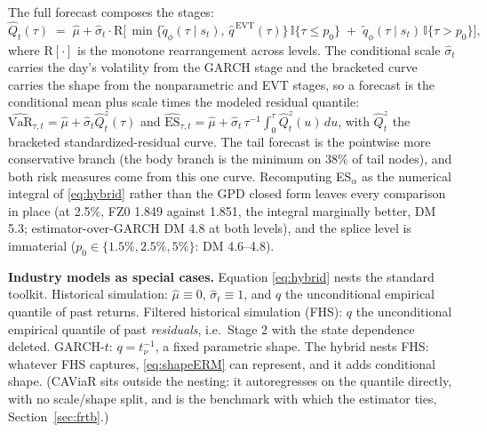 \documentclass[11pt]{article}
\newcommand{\VaR}{\mathrm{VaR}}
\newcommand{\ES}{\mathrm{ES}}
\theoremstyle{remark}
\begin{document}
The full forecast composes the stages:
\begin{equation}
\widehat{Q}_t(\tau) \;=\; \widehat{\mu} + \widehat{\sigma}_t \cdot
\mathrm{R}\Big[\, \min\{\widetilde{q}_\phi(\tau \mid s_t),\,
\widehat{q}^{\,\mathrm{EVT}}(\tau)\}\,\mathbb{I}\{\tau \le p_0\}
\;+\; \widetilde{q}_\phi(\tau \mid s_t)\,\mathbb{I}\{\tau > p_0\}
\Big],
\label{eq:hybrid}
\end{equation}
where $\mathrm{R}[\cdot]$ is the monotone rearrangement across
levels. The conditional scale $\widehat{\sigma}_t$ carries the day's
volatility from the GARCH stage and the bracketed curve carries the shape
from the nonparametric and EVT stages, so a forecast is the conditional mean
plus scale times the modeled residual quantile: $\widehat{\VaR}_{\tau,t}=\widehat{\mu}+\widehat{\sigma}_t\widehat{Q}^{z}_t(\tau)$
and $\widehat{\ES}_{\tau,t}=\widehat{\mu}+\widehat{\sigma}_t\,\tau^{-1}\!\int_0^\tau \widehat{Q}^{z}_t(u)\,du$,
with $\widehat{Q}^{z}_t$ the bracketed standardized-residual curve.
The tail forecast is the pointwise more conservative branch (the body branch is the minimum on 38\% of tail
nodes), and both risk measures come from this one curve. Recomputing
ES$_\alpha$ as the numerical integral of \eqref{eq:hybrid} rather than
the GPD closed form leaves every comparison in place (at 2.5\%, FZ0
1.849 against 1.851, the integral marginally better, DM 5.3;
estimator-over-GARCH DM 4.8 at both levels), and the splice level is
immaterial ($p_0\in\{1.5\%,2.5\%,5\%\}$: DM 4.6--4.8).

\noindent\textbf{Industry models as special cases.} Equation
\eqref{eq:hybrid} nests the standard toolkit. Historical simulation:
$\widehat{\mu}\equiv 0$, $\widehat{\sigma}_t \equiv 1$, and $q$ the unconditional
empirical quantile of past returns. Filtered historical simulation (FHS): $q$ the
unconditional empirical quantile of past \emph{residuals}, i.e.\ Stage 2 with the state dependence deleted. GARCH-$t$: $q = t_\nu^{-1}$, a fixed
parametric shape. The hybrid nests FHS: whatever
FHS captures, \eqref{eq:shapeERM} can represent, and it adds
conditional shape.
(CAViaR sits outside the nesting: it autoregresses on the quantile
directly, with no scale/shape split, and is the benchmark with which the
estimator ties, Section~\ref{sec:frtb}.)

\medskip\noindent{}
\end{document}
